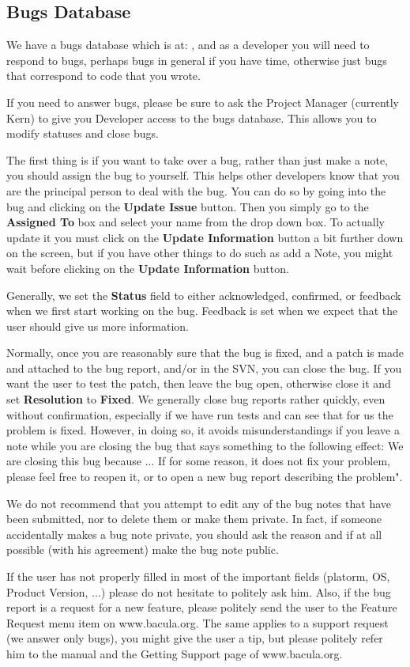 \subsection{Bugs Database}
We have a bugs database which is at:
, and as
a developer you will need to respond to bugs, perhaps bugs in general 
if you have time, otherwise just bugs that correspond to code that
you wrote.

If you need to answer bugs, please be sure to ask the Project Manager
(currently Kern) to give you Developer access to the bugs database. This
allows you to modify statuses and close bugs.

The first thing is if you want to take over a bug, rather than just make a
note, you should assign the bug to yourself. This helps other developers
know that you are the principal person to deal with the bug.  You can do so
by going into the bug and clicking on the {\bf Update Issue} button. Then
you simply go to the {\bf Assigned To} box and select your name from the
drop down box.  To actually update it you must click on the {\bf Update
Information} button a bit further down on the screen, but if you have other
things to do such as add a Note, you might wait before clicking on the {\bf
Update Information} button.

Generally, we set the {\bf Status} field to either acknowledged, confirmed,
or feedback when we first start working on the bug.  Feedback is set when
we expect that the user should give us more information.

Normally, once you are reasonably sure that the bug is fixed, and a patch
is made and attached to the bug report, and/or in the SVN, you can close
the bug.  If you want the user to test the patch, then leave the bug open,
otherwise close it and set {\bf Resolution} to {\bf Fixed}.  We generally
close bug reports rather quickly, even without confirmation, especially if
we have run tests and can see that for us the problem is fixed.  However,
in doing so, it avoids misunderstandings if you leave a note while you are
closing the bug that says something to the following effect:
We are closing this bug because ...   If for some reason, it does not fix
your problem, please feel free to reopen it, or to open a new bug report
describing the problem".

We do not recommend that you attempt to edit any of the bug notes that have
been submitted, nor to delete them or make them private.  In fact, if
someone accidentally makes a bug note private, you should ask the reason
and if at all possible (with his agreement) make the bug note public.  

If the user has not properly filled in most of the important fields
(platorm, OS, Product Version, ...) please do not hesitate to politely ask
him.  Also, if the bug report is a request for a new feature, please
politely send the user to the Feature Request menu item on www.bacula.org.
The same applies to a support request (we answer only bugs), you might give
the user a tip, but please politely refer him to the manual and the
Getting Support page of www.bacula.org.
